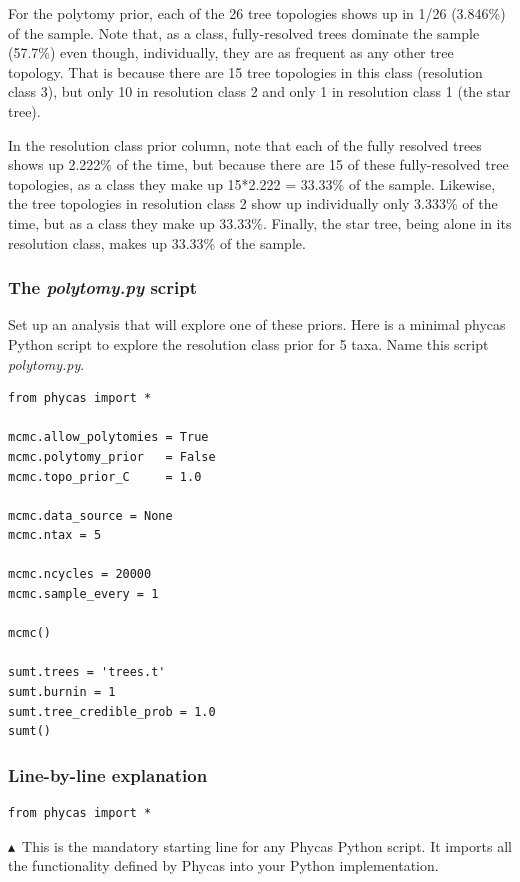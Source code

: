 \documentclass[10pt]{article}
\newcommand{\pathname}[1]{{\em #1}}				%
\newcommand{\pointup}{$\blacktriangle$}
\begin{document}
For the polytomy prior, each of the 26 tree topologies shows up in 1/26 (3.846\%) of the sample. Note that, as a class, fully-resolved trees dominate the sample (57.7\%) even though, individually, they are as frequent as any other tree topology. That is because there are 15 tree topologies in this class (resolution class 3), but only 10 in resolution class 2 and only 1 in resolution class 1 (the star tree).

In the resolution class prior column, note that each of the fully resolved trees shows up 2.222\% of the time, but because there are 15 of these fully-resolved tree topologies, as a class they make up 15*2.222 = 33.33\% of the sample. Likewise, the tree topologies in resolution class 2 show up individually only 3.333\% of the time, but as a class they make up 33.33\%. Finally, the star tree, being alone in its resolution class, makes up 33.33\% of the sample.

\subsubsection{The \pathname{polytomy.py} script}
Set up an analysis that will explore one of these priors. Here is a minimal phycas Python script to explore the resolution class prior for 5 taxa. Name this script \pathname{polytomy.py}.
\begin{verbatim}
from phycas import *

mcmc.allow_polytomies = True
mcmc.polytomy_prior   = False
mcmc.topo_prior_C     = 1.0

mcmc.data_source = None
mcmc.ntax = 5 
  
mcmc.ncycles = 20000
mcmc.sample_every = 1 

mcmc()

sumt.trees = 'trees.t'
sumt.burnin = 1
sumt.tree_credible_prob = 1.0
sumt()
\end{verbatim}

\subsubsection{Line-by-line explanation}
\begin{samepage}
\begin{verbatim}
from phycas import *
\end{verbatim}
\pointup\ This is the mandatory starting line for any Phycas Python script. It imports all the functionality defined by Phycas into your Python implementation.
\end{samepage}
\end{document}
